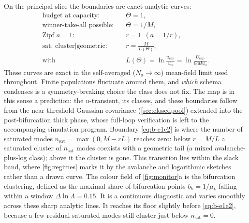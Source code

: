 \documentclass[
  aps,prx,
  reprint,
  superscriptaddress,
  nofootinbib,
  longbibliography
]{revtex4-2}
\newcommand{\Nag}{N_{\mathrm{a}}}
\begin{document}
\noindent On the principal slice the boundaries are exact analytic curves:
\begin{align}
\text{budget at capacity:}&\quad \Theta=1, \label{eq:b-theta1}\\
\text{winner-take-all possible:}&\quad \Theta=1/M, \label{eq:b-thetaM}\\
\text{Zipf $a=1$:}&\quad r=1 \ \ (a=1/r), \label{eq:b-a1}\\
\text{sat.\ cluster$|$geometric:}&\quad r=\frac{M}{L(\Theta)}, \label{eq:b-e1e2}\\
\text{with}&\quad L(\Theta)=\ln\frac{u_{\mathrm{cap}}}{u_0}=\ln\frac{U_{\mathrm{cap}}}{\Theta Mu_0}. \nonumber
\end{align}
These curves are exact in the self-averaged ($\Nag\to\infty$) mean-field limit used throughout. Finite populations fluctuate around them, and \emph{which} schema condenses is a symmetry-breaking choice the class does not fix. The map is in this sense a prediction: the $u$-transient, its classes, and these boundaries follow from the near-threshold Gaussian covariance (\cref{sec:closedpool}) extended into the post-bifurcation thick phase, whose full-loop verification is left to the accompanying simulation program.
Boundary \cref{eq:b-e1e2} is where the number of saturated modes $n_{\mathrm{sat}}=\max(0,M-rL)$ reaches zero: below $r=M/L$ a saturated cluster of $n_{\mathrm{sat}}$ modes coexists with a geometric tail (a mixed avalanche-plus-log class); above it the cluster is gone. This transition lies within the slack band, where \cref{fig:regimes} marks it by the avalanche and logarithmic sketches rather than a drawn curve. The colour field of \cref{fig:monitor}a is the bifurcation clustering, defined as the maximal share of bifurcation points $b_k=1/\mu_k$ falling within a window $\Delta\ln\Lambda=0.15$. It is a continuous diagnostic and varies smoothly across these sharp analytic lines. It reaches its floor slightly before \cref{eq:b-e1e2}, because a few residual saturated modes still cluster just below $n_{\mathrm{sat}}=0$.


\end{document}
